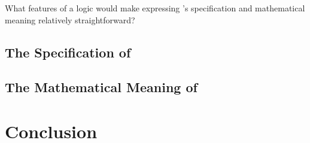 \documentclass[fleqn]{llncs}
\begin{document}
  \item What features of a logic would make expressing {\NRE}'s
    specification and mathematical meaning relatively straightforward?

\ee

\subsection{The Specification of {\NRE}}

\subsection{The Mathematical Meaning of {\NRE}}

\section{Conclusion}




\setcounter{tocdepth}{1}
\listoftodos
\setcounter{tocdepth}{0}
\end{document}
